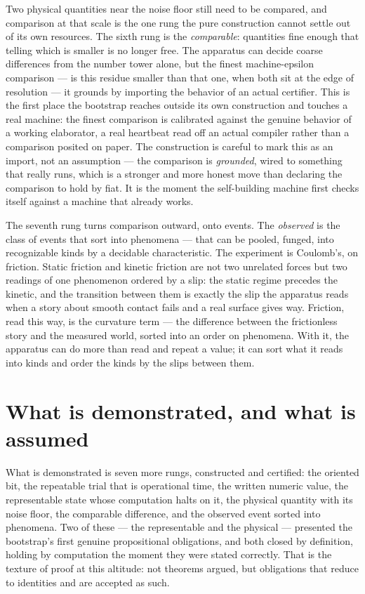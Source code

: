 Two physical quantities near the noise floor still need to be compared, and comparison at that scale is the
one rung the pure construction cannot settle out of its own resources. The sixth rung is the
\emph{comparable}: quantities fine enough that telling which is smaller is no longer free. The apparatus
can decide coarse differences from the number tower alone, but the finest machine-epsilon comparison ---
is this residue smaller than that one, when both sit at the edge of resolution --- it grounds by importing
the behavior of an actual certifier. This is the first place the bootstrap reaches outside its own
construction and touches a real machine: the finest comparison is calibrated against the genuine behavior
of a working elaborator, a real heartbeat read off an actual compiler rather than a comparison posited on
paper. The construction is careful to mark this as an import, not an assumption --- the comparison is
\emph{grounded}, wired to something that really runs, which is a stronger and more honest move than
declaring the comparison to hold by fiat. It is the moment the self-building machine first checks itself
against a machine that already works.

The seventh rung turns comparison outward, onto events. The \emph{observed} is the class of events that
sort into phenomena --- that can be pooled, funged, into recognizable kinds by a decidable characteristic.
The experiment is Coulomb's, on friction. Static friction and kinetic friction are not two unrelated
forces but two readings of one phenomenon ordered by a slip: the static regime precedes the kinetic, and
the transition between them is exactly the slip the apparatus reads when a story about smooth contact fails
and a real surface gives way. Friction, read this way, is the curvature term --- the difference between the
frictionless story and the measured world, sorted into an order on phenomena. With it, the apparatus can do
more than read and repeat a value; it can sort what it reads into kinds and order the kinds by the slips
between them.

\section{What is demonstrated, and what is assumed}
\label{se:demonstrated-assumed-I2}

What is demonstrated is seven more rungs, constructed and certified: the oriented bit, the repeatable
trial that is operational time, the written numeric value, the representable state whose computation halts
on it, the physical quantity with its noise floor, the comparable difference, and the observed event sorted
into phenomena. Two of these --- the representable and the physical --- presented the bootstrap's first
genuine propositional obligations, and both closed by definition, holding by computation the moment they
were stated correctly. That is the texture of proof at this altitude: not theorems argued, but obligations
that reduce to identities and are accepted as such.

